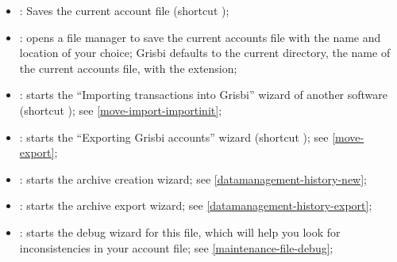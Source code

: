 \begin{itemize}
	\item {}: Saves the current account file (shortcut );%
	\item {}: opens a file manager to save the current accounts file with the name and location of your choice; Grisbi defaults to the current directory, the name of the current accounts file, with the  extension;%
	\item {}: starts the \enquote{Importing transactions into Grisbi} wizard of another software (shortcut ); see \vref{move-import-importinit};%
	\item {}: starts the \enquote{Exporting Grisbi accounts} wizard (shortcut ); see \vref{move-export};%
	\item {}: starts the archive creation wizard; see \vref{datamanagement-history-new};%
	\item {}: starts the archive export wizard; see \vref{datamanagement-history-export};%
	\item {}: starts the debug wizard for this file, which will help you look for inconsistencies in your account file; see \vref{maintenance-file-debug};%

\end{itemize}
